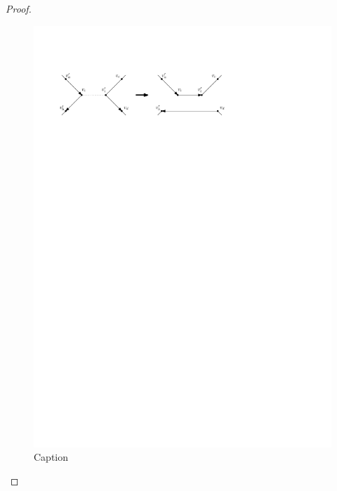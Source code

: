 \documentclass{article}
\begin{document}
\begin{proof}
\begin{itemize}
        \begin{figure}[]
            \centering
            \includegraphics{Assignment3/figures.pdf}
            \caption{Caption}
            \label{fig:enter-label}
        \end{figure}

        

        
    \end{itemize}
    
   


\end{proof}
\end{document}
